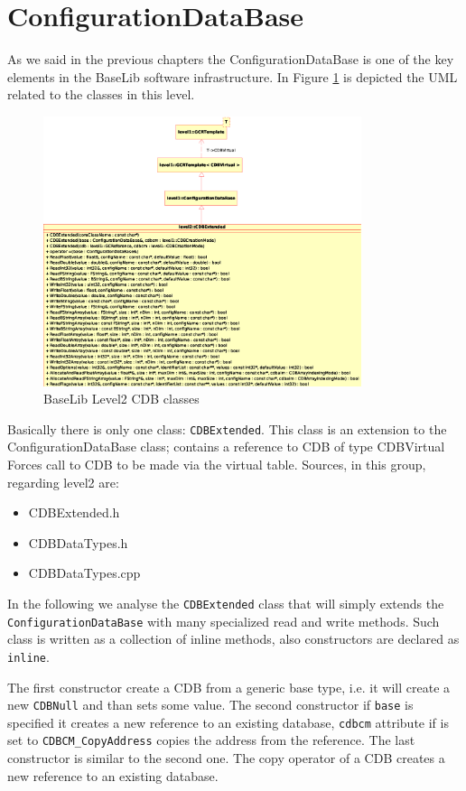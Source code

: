 \section{ConfigurationDataBase}
As we said in the previous chapters the ConfigurationDataBase is one of the key elements in the BaseLib software infrastructure. In Figure \ref{f:level2:CDB} is depicted the UML related to the classes in this level.
\begin{figure}[h!]
 \begin{center}
  \includegraphics[width=0.83\textwidth]{level2/level2-CDB.eps}
  \caption{BaseLib Level2 CDB classes}
  \label{f:level2:CDB}
 \end{center}
\end{figure}

Basically there is only one class: \texttt{CDBExtended}. This class is an extension to the ConfigurationDataBase class; contains a reference to CDB of type CDBVirtual Forces call to CDB to be made via the virtual table.
Sources, in this group, regarding level2 are:
\begin{itemize}
 \item CDBExtended.h
 \item CDBDataTypes.h
 \item CDBDataTypes.cpp
\end{itemize}

In the following we analyse the \texttt{CDBExtended} class that will simply extends the \texttt{ConfigurationDataBase} with many specialized read and write methods. Such class is written as a collection of inline methods, also constructors are declared as \texttt{inline}.

The first constructor create a CDB from a generic base type, i.e. it will create a new \texttt{CDBNull} and than sets some value. The second constructor if \texttt{base} is specified it creates a new reference to an existing database, \texttt{cdbcm} attribute if is set to \texttt{CDBCM\_CopyAddress} copies the address from the reference. The last constructor is similar to the second one. The copy operator of a CDB creates a new reference to an existing database.\\

